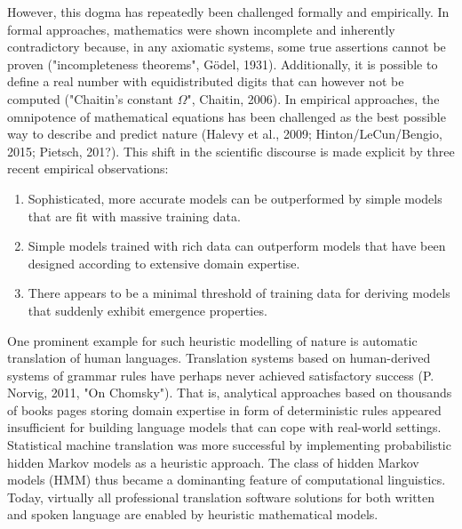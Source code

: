 \documentclass[authoryear,review,3p]{elsarticle}
\begin{document}
However, this dogma has repeatedly been challenged formally
and empirically.
%
In formal approaches,
mathematics were shown incomplete and inherently contradictory because,
in any axiomatic systems, some true assertions cannot be proven
("incompleteness theorems", G\"odel, 1931).
Additionally,
it is possible to define a real number with equidistributed
digits that can however not be computed
("Chaitin's constant $\Omega$", Chaitin, 2006).
%
In empirical approaches,
the omnipotence of mathematical equations has been challenged
as the
best possible way to describe and predict nature
(Halevy et al., 2009; Hinton/LeCun/Bengio, 2015; Pietsch, 201?).
%
This shift in the scientific discourse is made explicit by
three recent empirical observations:
\begin{enumerate}
  \item Sophisticated, more accurate models can be outperformed by
  simple models that are fit with massive training data.
  \item Simple models trained with rich data can outperform
  models that have been designed according to
  extensive domain expertise.
  \item There appears to be a minimal threshold of training data
  for deriving models that suddenly exhibit emergence properties.
\end{enumerate}

One prominent example for such heuristic modelling of nature is
automatic translation of human languages.
Translation systems based on 
human-derived systems of grammar rules have perhaps never achieved
satisfactory success (P. Norvig, 2011, "On Chomsky").
That is, analytical approaches based on
thousands of books pages storing domain expertise in form of
deterministic rules appeared insufficient for building
language models that can cope with real-world settings.
%
Statistical machine translation was more successful
by implementing probabilistic hidden Markov models
as a heuristic approach.
The class of hidden Markov models (HMM)
thus became a dominanting feature
of computational linguistics.
%
Today, virtually all professional translation software solutions
for both written and spoken language
are enabled by heuristic mathematical models.
\end{document}
